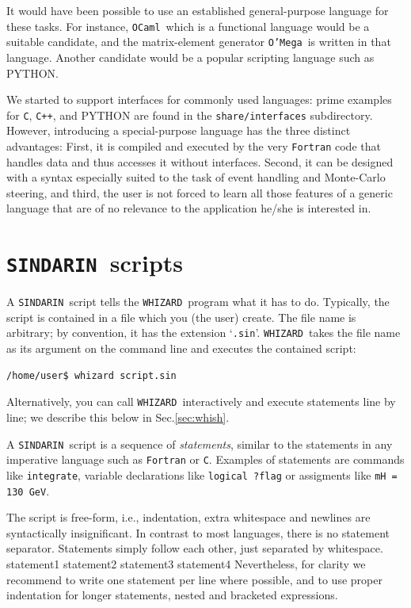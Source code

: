 \documentclass[12pt]{book}
\newenvironment{code}%
  {\begingroup\footnotesize
   \quote
   \Verbatim}%
  {\endVerbatim
   \endquote
   \endgroup\noindent}
\newcommand{\ttt}[1]{\texttt{#1}}
\newcommand{\whizard}{\ttt{WHIZARD}}
\newcommand{\oMega}{\ttt{O'Mega}}
\newcommand{\sindarin}{\ttt{SINDARIN}}
\newcommand{\cpp}{\ttt{C++}}
\newcommand{\ocaml}{\ttt{OCaml}}
\begin{document}
It would have been possible to use an established general-purpose language for
these tasks.  For instance, \ocaml\ which is a functional language would be a
suitable candidate, and the matrix-element generator \oMega\ is written in that
language.  Another candidate would be a popular scripting language such as
PYTHON.

We started to support interfaces for commonly used languages: prime
examples for \ttt{C}, \cpp, and PYTHON are found in the
\ttt{share/interfaces} subdirectory. However, introducing a
special-purpose language has the three distinct
advantages: First, it is compiled and executed by the very \ttt{Fortran} code that
handles data and thus accesses it without interfaces.  Second, it can be
designed with a syntax especially suited to the task of event handling and
Monte-Carlo steering, and third, the user is not forced to learn all those
features of a generic language that are of no relevance to the application he/she
is interested in.


\section{\sindarin\ scripts}

A \sindarin\ script tells the \whizard\ program what it has to do.  Typically,
the script is contained in a file which you (the user) create.  The file name
is arbitrary; by convention, it has the extension `\verb|.sin|'.
\whizard\ takes the file name as its argument on the command line and
executes the contained script:
\begin{verbatim}
/home/user$ whizard script.sin
\end{verbatim}
Alternatively, you can call \whizard\ interactively and execute
statements line by line; we describe this below in Sec.\ref{sec:whish}.

A \sindarin\ script is a sequence of \emph{statements}, similar to the
statements in any imperative language such as \ttt{Fortran} or
\ttt{C}.  Examples of statements are commands like \ttt{integrate},
variable declarations like \ttt{logical ?flag} or assigments like
\ttt{mH = 130 GeV}.

The script is free-form, i.e., indentation, extra whitespace and
newlines are syntactically insignificant.  In contrast to most
languages, there is no statement separator.  Statements simply follow each
other, just separated by whitespace.
\begin{code}
statement1 statement2
statement3
               statement4
\end{code}
Nevertheless, for clarity we recommend to
write one statement per line where possible, and to use proper
indentation for longer statements, nested and bracketed expressions.
\end{document}
